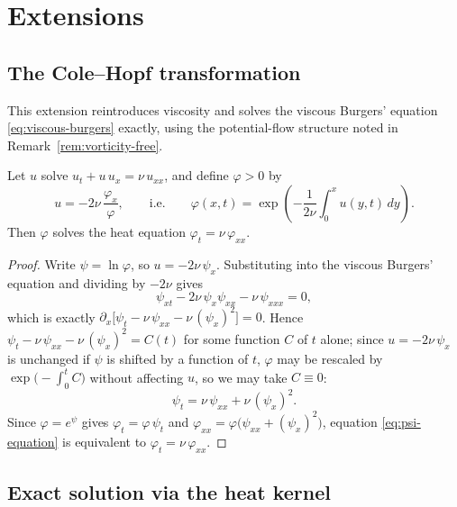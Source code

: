 \section{Extensions}
\label{sec:extensions}

\subsection{The Cole--Hopf transformation}
\label{subsec:cole-hopf}

This extension reintroduces viscosity and solves the viscous Burgers'
equation \eqref{eq:viscous-burgers} exactly, using the potential-flow
structure noted in Remark~\ref{rem:vorticity-free}.

\begin{theorem}
\label{thm:cole-hopf}
Let $u$ solve $u_t+u\,u_x=\nu\,u_{xx}$, and define $\varphi>0$ by
\begin{equation}
  \label{eq:cole-hopf-def}
  u = -2\nu\,\frac{\varphi_x}{\varphi}, \qquad \text{i.e.} \qquad \varphi(x,t) = \exp\left(-\frac{1}{2\nu}\int_0^x u(y,t)\, dy\right).
\end{equation}
Then $\varphi$ solves the heat equation $\varphi_t = \nu\, \varphi_{xx}$.
\end{theorem}

\begin{proof}
Write $\psi = \ln\varphi$, so $u=-2\nu\,\psi_x$. Substituting into the
viscous Burgers' equation and dividing by $-2\nu$ gives
\begin{equation}
  \psi_{xt} - 2\nu\,\psi_x\psi_{xx} - \nu\,\psi_{xxx} = 0,
\end{equation}
which is exactly $\partial_x\big[\psi_t - \nu\,\psi_{xx} - \nu\,(\psi_x)^2\big]=0$.
Hence $\psi_t - \nu\,\psi_{xx} - \nu\,(\psi_x)^2 = C(t)$ for some function
$C$ of $t$ alone; since $u=-2\nu\,\psi_x$ is unchanged if $\psi$ is
shifted by a function of $t$, $\varphi$ may be rescaled by
$\exp\!\big(-\!\int_0^t C\big)$ without affecting $u$, so we may take
$C\equiv0$:
\begin{equation}
  \label{eq:psi-equation}
  \psi_t = \nu\,\psi_{xx} + \nu\,(\psi_x)^2.
\end{equation}
Since $\varphi=e^\psi$ gives $\varphi_t=\varphi\,\psi_t$ and
$\varphi_{xx}=\varphi\big(\psi_{xx}+(\psi_x)^2\big)$, equation
\eqref{eq:psi-equation} is equivalent to $\varphi_t=\nu\,\varphi_{xx}$.
\end{proof}

\subsection{Exact solution via the heat kernel}
\label{subsec:cole-hopf-solution}

